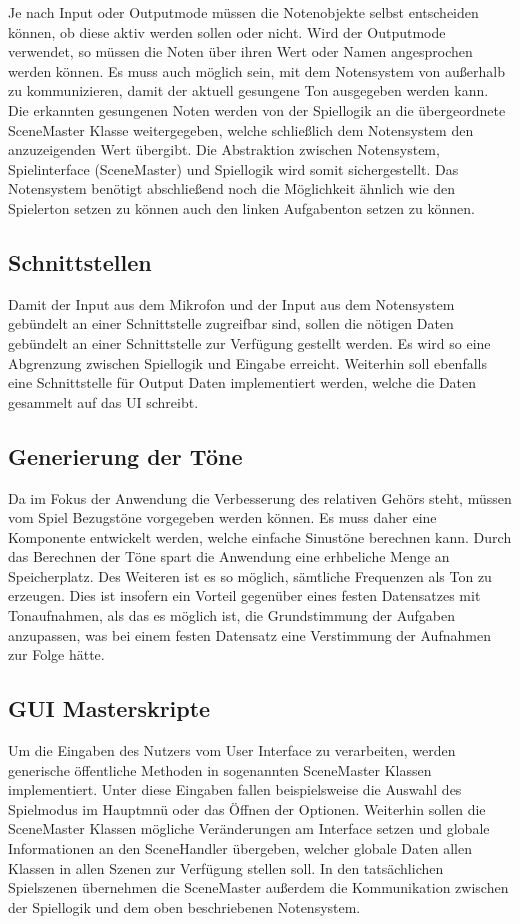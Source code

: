 Je nach Input oder Outputmode müssen die Notenobjekte selbst entscheiden können, ob diese aktiv werden sollen oder nicht. Wird der Outputmode verwendet, so müssen die Noten über ihren Wert oder Namen angesprochen werden können. Es muss auch möglich sein, mit dem Notensystem von außerhalb zu kommunizieren, damit der aktuell gesungene Ton ausgegeben werden kann. Die erkannten gesungenen Noten werden von der Spiellogik an die übergeordnete SceneMaster Klasse weitergegeben, welche schließlich dem Notensystem den anzuzeigenden Wert übergibt. Die Abstraktion zwischen Notensystem, Spielinterface (SceneMaster) und Spiellogik wird somit sichergestellt. Das Notensystem benötigt abschließend noch die Möglichkeit ähnlich wie den Spielerton setzen zu können auch den linken Aufgabenton setzen zu können.\\

\subsection{Schnittstellen}
Damit der Input aus dem Mikrofon und der Input aus dem Notensystem gebündelt an einer Schnittstelle zugreifbar sind, sollen die nötigen Daten gebündelt an einer Schnittstelle zur Verfügung gestellt werden. Es wird so eine Abgrenzung zwischen Spiellogik und Eingabe erreicht. Weiterhin soll ebenfalls eine Schnittstelle für Output Daten implementiert werden, welche die Daten gesammelt auf das UI schreibt.

\subsection{Generierung der Töne}
Da im Fokus der Anwendung die Verbesserung des relativen Gehörs steht, müssen vom Spiel Bezugstöne vorgegeben werden können. Es muss daher eine Komponente entwickelt werden, welche einfache Sinustöne berechnen kann. Durch das Berechnen der Töne spart die Anwendung eine erhbeliche Menge an Speicherplatz. Des Weiteren ist es so möglich, sämtliche Frequenzen als Ton zu erzeugen. Dies ist insofern ein Vorteil gegenüber eines festen Datensatzes mit Tonaufnahmen, als das es möglich ist, die Grundstimmung der Aufgaben anzupassen, was bei einem festen Datensatz eine Verstimmung der Aufnahmen zur Folge hätte. 

\subsection{GUI Masterskripte}
Um die Eingaben des Nutzers vom User Interface zu verarbeiten, werden generische öffentliche Methoden in sogenannten SceneMaster Klassen implementiert. Unter diese Eingaben fallen beispielsweise die Auswahl des Spielmodus im Hauptmnü oder das Öffnen der Optionen. Weiterhin sollen die SceneMaster Klassen mögliche Veränderungen am Interface setzen und globale Informationen an den SceneHandler übergeben, welcher globale Daten allen Klassen in allen Szenen zur Verfügung stellen soll. In den tatsächlichen Spielszenen übernehmen die SceneMaster außerdem die Kommunikation zwischen der Spiellogik und dem oben beschriebenen Notensystem.

